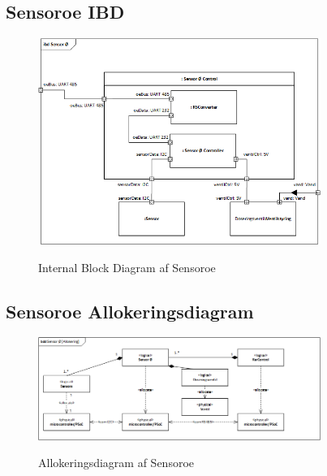 \subsection{Sensoroe IBD}

\begin{figure}[H]
	\centering
	\includegraphics[width=0.82\textwidth]{Systemarkitektur/Sensoroe/Sensoroe_IBD.png}
	\label{fig:Sensoroe BDD}
	\caption{Internal Block Diagram af Sensoroe}
\end{figure}



\subsection{Sensoroe Allokeringsdiagram}

\begin{figure}[H]
	\centering
	\includegraphics[width=0.82\textwidth]{Systemarkitektur/Sensoroe/Sensoroe_Allokeringsdiagram.png}
	\label{fig:Sensoroe BDD}
	\caption{Allokeringsdiagram af Sensoroe}
\end{figure}